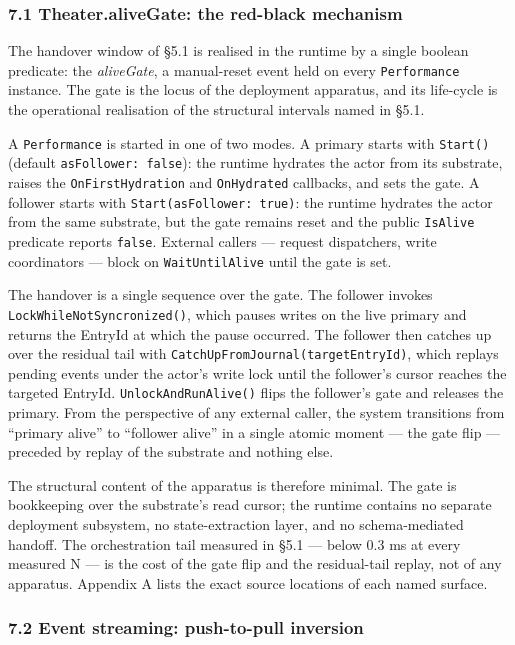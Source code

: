 \documentclass[
]{article}
\begin{document}
\subsubsection{7.1 Theater.aliveGate: the red-black
mechanism}\label{theater.alivegate-the-red-black-mechanism}

The handover window of §5.1 is realised in the runtime by a single
boolean predicate: the \emph{aliveGate}, a manual-reset event held on
every \texttt{Performance} instance. The gate is the locus of the
deployment apparatus, and its life-cycle is the operational realisation
of the structural intervals named in §5.1.

A \texttt{Performance} is started in one of two modes. A primary starts
with \texttt{Start()} (default \texttt{asFollower:\ false}): the runtime
hydrates the actor from its substrate, raises the
\texttt{OnFirstHydration} and \texttt{OnHydrated} callbacks, and sets
the gate. A follower starts with \texttt{Start(asFollower:\ true)}: the
runtime hydrates the actor from the same substrate, but the gate remains
reset and the public \texttt{IsAlive} predicate reports \texttt{false}.
External callers --- request dispatchers, write coordinators --- block
on \texttt{WaitUntilAlive} until the gate is set.

The handover is a single sequence over the gate. The follower invokes
\texttt{LockWhileNotSyncronized()}, which pauses writes on the live
primary and returns the EntryId at which the pause occurred. The
follower then catches up over the residual tail with
\texttt{CatchUpFromJournal(targetEntryId)}, which replays pending events
under the actor's write lock until the follower's cursor reaches the
targeted EntryId. \texttt{UnlockAndRunAlive()} flips the follower's gate
and releases the primary. From the perspective of any external caller,
the system transitions from ``primary alive'' to ``follower alive'' in a
single atomic moment --- the gate flip --- preceded by replay of the
substrate and nothing else.

The structural content of the apparatus is therefore minimal. The gate
is bookkeeping over the substrate's read cursor; the runtime contains no
separate deployment subsystem, no state-extraction layer, and no
schema-mediated handoff. The orchestration tail measured in §5.1 ---
below 0.3 ms at every measured N --- is the cost of the gate flip and
the residual-tail replay, not of any apparatus. Appendix A lists the
exact source locations of each named surface.

\subsubsection{7.2 Event streaming: push-to-pull
inversion}\label{event-streaming-push-to-pull-inversion}
\end{document}
